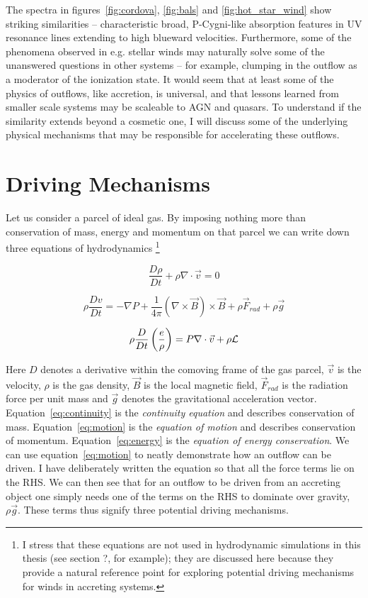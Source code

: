 The spectra in figures~\ref{fig:cordova}, \ref{fig:bals}
and \ref{fig:hot_star_wind} show striking similarities -- 
characteristic broad, P-Cygni-like absorption features in UV resonance
lines extending to high blueward velocities. Furthermore, some of the
phenomena observed in e.g. stellar winds may naturally solve some of 
the unanswered questions in other systems -- for example, clumping
in the outflow as a moderator of the ionization state. It would seem
that at least some of the physics of outflows, like accretion,
is universal, and that lessons learned from smaller scale systems may be
scaleable to AGN and quasars. To understand if the similarity extends beyond
a cosmetic one, I will discuss some of the 
underlying physical mechanisms that may be responsible for accelerating
these outflows.

\section{Driving Mechanisms}

Let us consider a parcel of ideal gas. By imposing nothing more than
conservation of mass, energy and momentum on that parcel we can write down
three equations of hydrodynamics
\footnote{I stress that these equations are not used in hydrodynamic
simulations in this thesis (see section ?, for example); 
they are discussed here because they provide a natural reference point
for exploring potential driving mechanisms for winds in accreting systems.
}

\begin{equation}
\label{eq:continuity}
\frac{D \rho}{Dt} + \rho \nabla \cdot \vec{v} = 0
\end{equation}

\begin{equation}
\label{eq:motion}
\rho \frac{Dv}{Dt} = -\nabla P + \frac{1}{4 \pi}(\nabla \times \vec{B}) \times \vec{B} + \rho \vec{F}_{rad} + \rho \vec{g}
\end{equation}

\begin{equation}
\label{eq:energy}
\rho \frac{D}{Dt} \left(\frac{e}{\rho}\right) = P \nabla \cdot \vec{v} + \rho \cal{L}
\end{equation}

Here $D$ denotes a derivative within the comoving frame of the gas parcel, $\vec{v}$ is the velocity,
$\rho$ is the gas density, $\vec{B}$ is the local magnetic field, $\vec{F}_{rad}$ is the radiation
force per unit mass and $\vec{g}$ denotes the gravitational acceleration vector.
Equation~\ref{eq:continuity} is the {\em continuity equation} and describes conservation of mass. 
Equation~\ref{eq:motion} is the {\em equation of motion} and describes conservation of momentum.
Equation~\ref{eq:energy} is the {\em equation of energy conservation}. 
We can use equation~\ref{eq:motion} to neatly demonstrate how an outflow can be driven. I have 
deliberately written the equation so that all the force terms lie on the RHS. We can then see that
for an outflow to be driven from an accreting object one simply needs one of the terms on
the RHS to dominate over gravity, $\rho \vec{g}$. These terms thus signify three potential
driving mechanisms.

